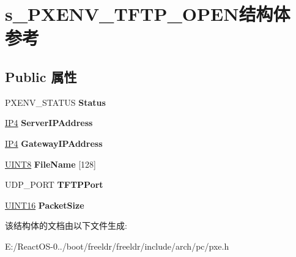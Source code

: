 \hypertarget{structs___p_x_e_n_v___t_f_t_p___o_p_e_n}{}\section{s\+\_\+\+P\+X\+E\+N\+V\+\_\+\+T\+F\+T\+P\+\_\+\+O\+P\+E\+N结构体 参考}
\label{structs___p_x_e_n_v___t_f_t_p___o_p_e_n}
\subsection*{Public 属性}
\begin{DoxyCompactItemize}
\item 
\mbox{\label{structs___p_x_e_n_v___t_f_t_p___o_p_e_n_a4b211b430f790690d236cdd34a3c47e8}} 
P\+X\+E\+N\+V\+\_\+\+S\+T\+A\+T\+US {\bfseries Status}
\item 
\mbox{\label{structs___p_x_e_n_v___t_f_t_p___o_p_e_n_a0ed90f2ec21baec8823749b36ac7cb4f}} 
\hyperlink{union_i_p4}{I\+P4} {\bfseries Server\+I\+P\+Address}
\item 
\mbox{\label{structs___p_x_e_n_v___t_f_t_p___o_p_e_n_abdaba36265ef74880174af0a4b8505bd}} 
\hyperlink{union_i_p4}{I\+P4} {\bfseries Gateway\+I\+P\+Address}
\item 
\mbox{\label{structs___p_x_e_n_v___t_f_t_p___o_p_e_n_a48c0a7662608a6069ac8863796639879}} 
\hyperlink{_processor_bind_8h_ab27e9918b538ce9d8ca692479b375b6a}{U\+I\+N\+T8} {\bfseries File\+Name} \mbox{[}128\mbox{]}
\item 
\mbox{\label{structs___p_x_e_n_v___t_f_t_p___o_p_e_n_a91348234c75e4f878992e2a406fd85ff}} 
U\+D\+P\+\_\+\+P\+O\+RT {\bfseries T\+F\+T\+P\+Port}
\item 
\mbox{\label{structs___p_x_e_n_v___t_f_t_p___o_p_e_n_a25324a77c5f2f869a1fd199309fa1d3b}} 
\hyperlink{_processor_bind_8h_a09f1a1fb2293e33483cc8d44aefb1eb1}{U\+I\+N\+T16} {\bfseries Packet\+Size}
\end{DoxyCompactItemize}


该结构体的文档由以下文件生成\+:\begin{DoxyCompactItemize}
\item 
E\+:/\+React\+O\+S-\/0../boot/freeldr/freeldr/include/arch/pc/pxe.\+h\end{DoxyCompactItemize}

